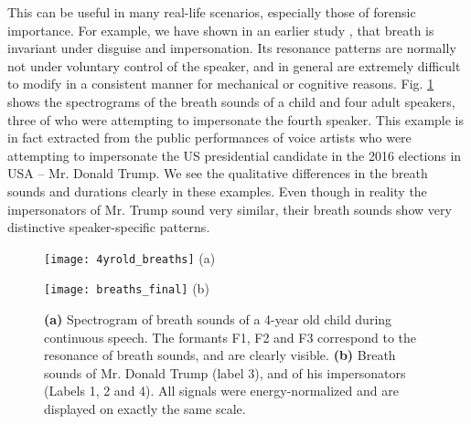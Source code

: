 \documentclass[a4paper]{article}
\begin{document}
This can be useful in many real-life scenarios, especially those of forensic importance. For example, we have shown in an earlier study   \cite{singhmeskimen2016}, that breath is invariant under disguise and impersonation. Its resonance patterns are normally not under voluntary control of the speaker, and in general are extremely difficult to modify in a consistent manner for mechanical or cognitive reasons. Fig. \ref{fig:breathsounds} shows the spectrograms of the breath sounds of a child and four adult speakers, three of who were attempting to impersonate the fourth speaker. This example is in fact extracted from the public performances of voice artists who were attempting to impersonate the US presidential candidate in the 2016 elections in USA -- Mr. Donald Trump. We see the qualitative differences in the breath sounds and durations clearly in these examples. Even though in reality the impersonators of Mr. Trump sound very similar, their breath sounds show very distinctive speaker-specific patterns.

\begin{figure}[!ht]
\centering
\begin{minipage}[b]{0.8\linewidth}
\texttt{[image: 4yrold\_breaths]} %
(a)
\end{minipage}\hfill
\centering
\begin{minipage}[b]{0.8\linewidth}
\texttt{[image: breaths\_final]} %
(b)
\end{minipage}\hfill
\caption {\textbf{(a)} Spectrogram of breath sounds of a 4-year old child during continuous speech. The formants F1, F2 and F3 correspond to the resonance of breath sounds, and are clearly visible. \textbf{(b)} Breath sounds of Mr. Donald Trump (label 3), and of his impersonators (Labels 1, 2 and 4). All signals were energy-normalized and are displayed on exactly the same scale. }
\label{fig:breathsounds}
\end{figure}
\vspace{-0.5cm}


%
\end{document}
